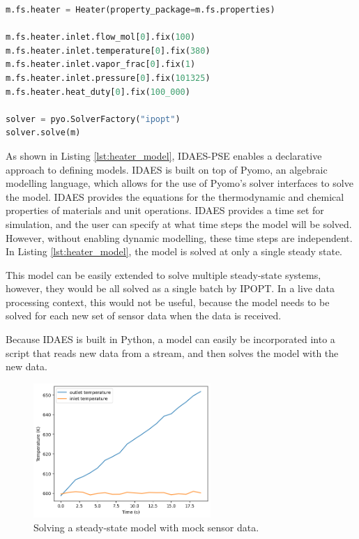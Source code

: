 \documentclass[12pt]{article}
\begin{document}
\begin{lstlisting}[language=Python,caption=Defining a simple heater model in IDAES,label=lst:heater_model]
m.fs.heater = Heater(property_package=m.fs.properties)

m.fs.heater.inlet.flow_mol[0].fix(100)
m.fs.heater.inlet.temperature[0].fix(380)
m.fs.heater.inlet.vapor_frac[0].fix(1)
m.fs.heater.inlet.pressure[0].fix(101325)
m.fs.heater.heat_duty[0].fix(100_000)

solver = pyo.SolverFactory("ipopt")
solver.solve(m)

\end{lstlisting}

As shown in Listing \ref{lst:heater_model}, IDAES-PSE enables a declarative approach to defining models. IDAES is built on top of Pyomo, an algebraic modelling language, which allows for the use of Pyomo's solver interfaces to solve the model. IDAES provides the equations for the thermodynamic and chemical properties of materials and unit operations. IDAES provides a time set for simulation, and the user can specify at what time steps the model will be solved. However, without enabling dynamic modelling, these time steps are independent. In Listing \ref{lst:heater_model}, the model is solved at only a single steady state.

This model can be easily extended to solve multiple steady-state systems, however, they would be all solved as a single batch by IPOPT. In a live data processing context, this would not be useful, because the model needs to be solved for each new set of sensor data when the data is received. 

Because IDAES is built in Python, a model can easily be incorporated into a script that reads new data from a stream, and then solves the model with the new data. 

\begin{figure}
    \centering
    \includegraphics[width=0.6\textwidth]{live_data_processing.png}
    \caption{Solving a steady-state model with mock sensor data.}
    \label{fig:live_mss}
\end{figure}
\end{document}
